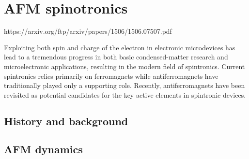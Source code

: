 \chapter{AFM spinotronics}

https://arxiv.org/ftp/arxiv/papers/1506/1506.07507.pdf

Exploiting both spin and charge of the electron in electronic microdevices has lead to a tremendous progress in both basic
condensed-matter research and microelectronic applications, resulting in the modern field of spintronics. Current spintronics
relies primarily on ferromagnets while antiferromagnets have traditionally played only a supporting role. Recently,
antiferromagnets have been revisited as potential candidates for the key active elements in spintronic devices.

\section{History and background}

\section{AFM dynamics}